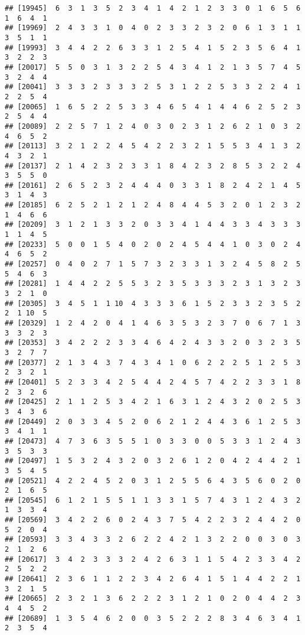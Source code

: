 \documentclass[
]{article}
\begin{document}
\begin{verbatim}
## [19945]  6  3  1  3  5  2  3  4  1  4  2  1  2  3  3  0  1  6  5  6  1  6  4  1
## [19969]  2  4  3  3  1  0  4  0  2  3  3  2  3  2  0  6  1  3  1  1  3  5  1  1
## [19993]  3  4  4  2  2  6  3  3  1  2  5  4  1  5  2  3  5  6  4  1  3  2  2  3
## [20017]  5  5  0  3  1  3  2  2  5  4  3  4  1  2  1  3  5  7  4  5  3  2  4  4
## [20041]  3  3  3  2  3  3  3  2  5  3  1  2  2  5  3  3  2  2  4  1  2  2  5  4
## [20065]  1  6  5  2  2  5  3  3  4  6  5  4  1  4  4  6  2  5  2  3  2  5  4  4
## [20089]  2  2  5  7  1  2  4  0  3  0  2  3  1  2  6  2  1  0  3  2  4  6  5  2
## [20113]  3  2  1  2  2  4  5  4  2  2  3  2  1  5  5  3  4  1  3  2  4  3  2  1
## [20137]  2  1  4  2  3  2  3  3  1  8  4  2  3  2  8  5  3  2  2  4  3  5  5  0
## [20161]  2  6  5  2  3  2  4  4  4  0  3  3  1  8  2  4  2  1  4  5  3  1  4  3
## [20185]  6  2  5  2  1  2  1  2  4  8  4  4  5  3  2  0  1  2  3  2  1  4  6  6
## [20209]  3  1  2  1  3  3  2  0  3  3  4  1  4  4  3  3  4  3  3  3  1  1  4  5
## [20233]  5  0  0  1  5  4  0  2  0  2  4  5  4  4  1  0  3  0  2  4  4  6  5  2
## [20257]  0  4  0  2  7  1  5  7  3  2  3  3  1  3  2  4  5  8  2  5  5  4  6  3
## [20281]  1  4  4  2  2  5  5  3  2  3  5  3  3  3  2  3  1  3  2  3  3  2  1  0
## [20305]  3  4  5  1  1 10  4  3  3  3  6  1  5  2  3  3  2  3  5  2  2  1 10  5
## [20329]  1  2  4  2  0  4  1  4  6  3  5  3  2  3  7  0  6  7  1  3  3  3  2  3
## [20353]  3  4  2  2  2  3  3  4  6  4  2  4  3  3  2  0  3  2  3  5  3  2  7  7
## [20377]  2  1  3  4  3  7  4  3  4  1  0  6  2  2  2  5  1  2  5  3  2  3  2  1
## [20401]  5  2  3  3  4  2  5  4  4  2  4  5  7  4  2  2  3  3  1  8  2  3  2  6
## [20425]  2  1  1  2  5  3  4  2  1  6  3  1  2  4  3  2  0  2  5  3  3  4  3  6
## [20449]  2  0  3  3  4  5  2  0  6  2  1  2  4  4  3  6  1  2  5  3  3  4  1  1
## [20473]  4  7  3  6  3  5  5  1  0  3  3  0  0  5  3  3  1  2  4  3  3  5  3  3
## [20497]  1  5  3  2  4  3  2  0  3  2  6  1  2  0  4  2  4  4  2  1  3  5  4  5
## [20521]  4  2  2  4  5  2  0  3  1  2  5  5  6  4  3  5  6  0  2  0  2  1  6  5
## [20545]  6  1  2  1  5  5  1  1  3  3  1  5  7  4  3  1  2  4  3  2  1  3  3  4
## [20569]  3  4  2  2  6  0  2  4  3  7  5  4  2  2  3  2  4  4  2  0  5  2  0  4
## [20593]  3  3  4  3  3  2  6  2  2  4  2  1  3  2  2  0  0  3  0  3  2  1  2  6
## [20617]  3  4  2  3  3  3  2  4  2  6  3  1  1  5  4  2  3  3  4  2  2  5  2  2
## [20641]  2  3  6  1  1  2  2  3  4  2  6  4  1  5  1  4  4  2  2  1  3  2  1  5
## [20665]  2  3  2  1  3  6  2  2  2  3  1  2  1  0  2  0  4  4  2  3  4  4  5  2
## [20689]  1  3  5  4  6  2  0  0  3  5  2  2  2  8  3  4  6  3  4  1  2  3  5  4

\end{verbatim}
\end{document}
